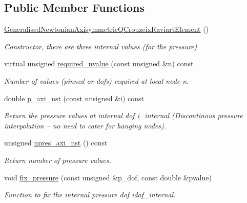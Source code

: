 \subsection*{Public Member Functions}
\begin{DoxyCompactItemize}
\item 
\hyperlink{classoomph_1_1GeneralisedNewtonianAxisymmetricQCrouzeixRaviartElement_aaa144c84efff61d34ba9c5769954d6c8}{Generalised\+Newtonian\+Axisymmetric\+Q\+Crouzeix\+Raviart\+Element} ()
\begin{DoxyCompactList}\small\item\em Constructor, there are three internal values (for the pressure) \end{DoxyCompactList}\item 
virtual unsigned \hyperlink{classoomph_1_1GeneralisedNewtonianAxisymmetricQCrouzeixRaviartElement_aa2a056b7c778f105ce71a2b4c884e6d7}{required\+\_\+nvalue} (const unsigned \&n) const
\begin{DoxyCompactList}\small\item\em Number of values (pinned or dofs) required at local node n. \end{DoxyCompactList}\item 
double \hyperlink{classoomph_1_1GeneralisedNewtonianAxisymmetricQCrouzeixRaviartElement_a09014883530f2debb0858fa669522c64}{p\+\_\+axi\+\_\+nst} (const unsigned \&\hyperlink{cfortran_8h_adb50e893b86b3e55e751a42eab3cba82}{i}) const
\begin{DoxyCompactList}\small\item\em Return the pressure values at internal dof i\+\_\+internal (Discontinous pressure interpolation -- no need to cater for hanging nodes). \end{DoxyCompactList}\item 
unsigned \hyperlink{classoomph_1_1GeneralisedNewtonianAxisymmetricQCrouzeixRaviartElement_ada9aded5d7ad32924db60b5af2b704c1}{npres\+\_\+axi\+\_\+nst} () const
\begin{DoxyCompactList}\small\item\em Return number of pressure values. \end{DoxyCompactList}\item 
void \hyperlink{classoomph_1_1GeneralisedNewtonianAxisymmetricQCrouzeixRaviartElement_ac9f7cbb723c9abf2c6f34aef1cf999b0}{fix\+\_\+pressure} (const unsigned \&p\+\_\+dof, const double \&pvalue)
\begin{DoxyCompactList}\small\item\em Function to fix the internal pressure dof idof\+\_\+internal. \end{DoxyCompactList}\item 

\end{DoxyCompactItemize}
